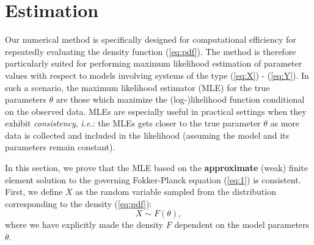 \documentclass[10pt]{article}
\begin{document}


\section{Estimation}
Our numerical method is specifically designed for computational
efficiency for repeatedly evaluating the density function
(\ref{eq:pdf}). The method is therefore particularly suited for
performing maximum likelihood estimation of parameter values with
respect to models involving systems of the type (\ref{eq:X}) -
(\ref{eq:Y}). In such a scenario, the maximum likelihood estimator
(MLE) for the true parameters $\theta$ are those which maximize the
(log-)likelihood function conditional on the observed data. MLEs are
especially useful in practical settings when they exhibit
\textit{consistency}, \textit{i.e.}: the MLEs gets closer to the true
parameter $\theta$ as more data is collected and included in the
likelihood (assuming the model and its parameters remain constant).

In this section, we prove that the MLE based on the
\textbf{approximate} (weak) finite element solution to the governing
Fokker-Planck equation (\ref{eq:1}) is consistent. First, we define
$X$ as the random variable sampled from the distribution corresponding
to the density (\ref{eq:pdf}):
\[
  X \sim F(\theta),
\]
where we have explicitly made the density $F$ dependent on the model
parameters $\theta$.
\end{document}
